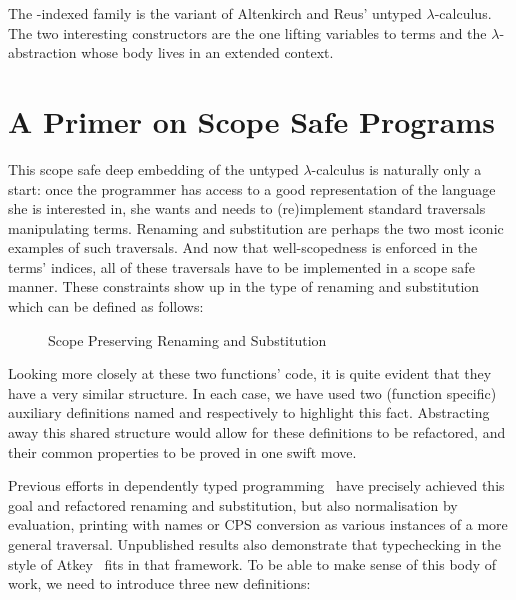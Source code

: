 The -indexed family  is the variant of Altenkirch and Reus' untyped
$\lambda$-calculus. The two interesting constructors are the one lifting variables
to terms and the $\lambda$-abstraction whose body lives in an extended context.

\section{A Primer on Scope Safe Programs}\label{section:primer-program}

This scope safe deep embedding of the untyped $\lambda$-calculus is
naturally only a start: once the programmer has access to a good
representation of the language she is interested in, she wants and
needs to (re)implement standard traversals manipulating terms.
Renaming and substitution are perhaps the two most iconic examples
of such traversals. And now that well-scopedness is enforced in
the terms' indices, all of these traversals have to be implemented
in a scope safe manner. These constraints show up in the type of
renaming and substitution which can be defined as follows:

\begin{figure}[h]
\begin{minipage}{0.45\textwidth}
\end{minipage}\hspace{2em}
\begin{minipage}{0.45\textwidth}
\end{minipage}
\caption{Scope Preserving Renaming and Substitution}
\end{figure}

Looking more closely at these two functions' code, it is quite evident
that they have a very similar structure. In each case, we have used
two (function specific) auxiliary definitions named  and 
respectively to highlight this fact. Abstracting away this shared structure
would allow for these definitions to be refactored, and their common
properties to be proved in one swift move.

Previous efforts in dependently typed
programming~\cite{mcbride2005type,benton2012strongly,allais2017type}
have precisely achieved this goal and refactored renaming and substitution,
but also normalisation by evaluation, printing with names or CPS conversion
as various instances of a more general traversal. Unpublished results also
demonstrate that typechecking in the style of Atkey~\citeyear{atkey2015algebraic}
fits in that framework. To be able to make sense of this body of work, we
need to introduce three new definitions:

